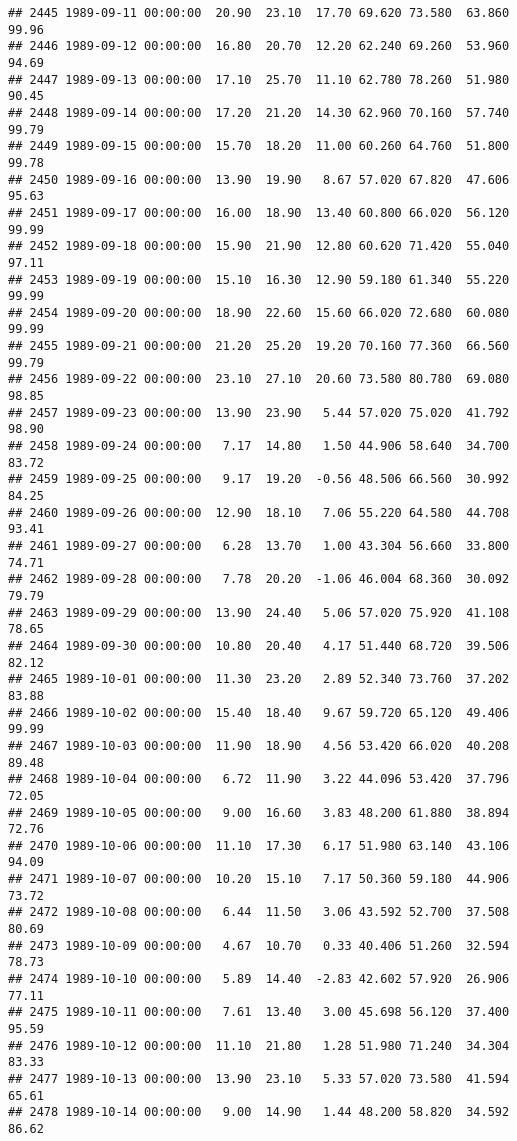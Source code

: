 \documentclass{article}\usepackage{graphicx, color}
\makeatletter
\newenvironment{kframe}{%
 \def\at@end@of@kframe{}%
 \ifinner\ifhmode%
  \def\at@end@of@kframe{\end{minipage}}%
  \begin{minipage}{\columnwidth}%
 \fi\fi%
 \def\FrameCommand##1{\hskip\@totalleftmargin \hskip-\fboxsep
 \colorbox{shadecolor}{##1}\hskip-\fboxsep
     \hskip-\linewidth \hskip-\@totalleftmargin \hskip\columnwidth}%
 \MakeFramed {\advance\hsize-\width
   \@totalleftmargin\z@ \linewidth\hsize
   \@setminipage}}%
 {\par\unskip\endMakeFramed%
 \at@end@of@kframe}
\newenvironment{knitrout}{}{} %
\makeatother
\begin{document}
\begin{knitrout}
\begin{kframe}
\begin{verbatim}
## 2445 1989-09-11 00:00:00  20.90  23.10  17.70 69.620 73.580  63.860  99.96
## 2446 1989-09-12 00:00:00  16.80  20.70  12.20 62.240 69.260  53.960  94.69
## 2447 1989-09-13 00:00:00  17.10  25.70  11.10 62.780 78.260  51.980  90.45
## 2448 1989-09-14 00:00:00  17.20  21.20  14.30 62.960 70.160  57.740  99.79
## 2449 1989-09-15 00:00:00  15.70  18.20  11.00 60.260 64.760  51.800  99.78
## 2450 1989-09-16 00:00:00  13.90  19.90   8.67 57.020 67.820  47.606  95.63
## 2451 1989-09-17 00:00:00  16.00  18.90  13.40 60.800 66.020  56.120  99.99
## 2452 1989-09-18 00:00:00  15.90  21.90  12.80 60.620 71.420  55.040  97.11
## 2453 1989-09-19 00:00:00  15.10  16.30  12.90 59.180 61.340  55.220  99.99
## 2454 1989-09-20 00:00:00  18.90  22.60  15.60 66.020 72.680  60.080  99.99
## 2455 1989-09-21 00:00:00  21.20  25.20  19.20 70.160 77.360  66.560  99.79
## 2456 1989-09-22 00:00:00  23.10  27.10  20.60 73.580 80.780  69.080  98.85
## 2457 1989-09-23 00:00:00  13.90  23.90   5.44 57.020 75.020  41.792  98.90
## 2458 1989-09-24 00:00:00   7.17  14.80   1.50 44.906 58.640  34.700  83.72
## 2459 1989-09-25 00:00:00   9.17  19.20  -0.56 48.506 66.560  30.992  84.25
## 2460 1989-09-26 00:00:00  12.90  18.10   7.06 55.220 64.580  44.708  93.41
## 2461 1989-09-27 00:00:00   6.28  13.70   1.00 43.304 56.660  33.800  74.71
## 2462 1989-09-28 00:00:00   7.78  20.20  -1.06 46.004 68.360  30.092  79.79
## 2463 1989-09-29 00:00:00  13.90  24.40   5.06 57.020 75.920  41.108  78.65
## 2464 1989-09-30 00:00:00  10.80  20.40   4.17 51.440 68.720  39.506  82.12
## 2465 1989-10-01 00:00:00  11.30  23.20   2.89 52.340 73.760  37.202  83.88
## 2466 1989-10-02 00:00:00  15.40  18.40   9.67 59.720 65.120  49.406  99.99
## 2467 1989-10-03 00:00:00  11.90  18.90   4.56 53.420 66.020  40.208  89.48
## 2468 1989-10-04 00:00:00   6.72  11.90   3.22 44.096 53.420  37.796  72.05
## 2469 1989-10-05 00:00:00   9.00  16.60   3.83 48.200 61.880  38.894  72.76
## 2470 1989-10-06 00:00:00  11.10  17.30   6.17 51.980 63.140  43.106  94.09
## 2471 1989-10-07 00:00:00  10.20  15.10   7.17 50.360 59.180  44.906  73.72
## 2472 1989-10-08 00:00:00   6.44  11.50   3.06 43.592 52.700  37.508  80.69
## 2473 1989-10-09 00:00:00   4.67  10.70   0.33 40.406 51.260  32.594  78.73
## 2474 1989-10-10 00:00:00   5.89  14.40  -2.83 42.602 57.920  26.906  77.11
## 2475 1989-10-11 00:00:00   7.61  13.40   3.00 45.698 56.120  37.400  95.59
## 2476 1989-10-12 00:00:00  11.10  21.80   1.28 51.980 71.240  34.304  83.33
## 2477 1989-10-13 00:00:00  13.90  23.10   5.33 57.020 73.580  41.594  65.61
## 2478 1989-10-14 00:00:00   9.00  14.90   1.44 48.200 58.820  34.592  86.62

\end{verbatim}
\end{kframe}
\end{knitrout}
\end{document}
